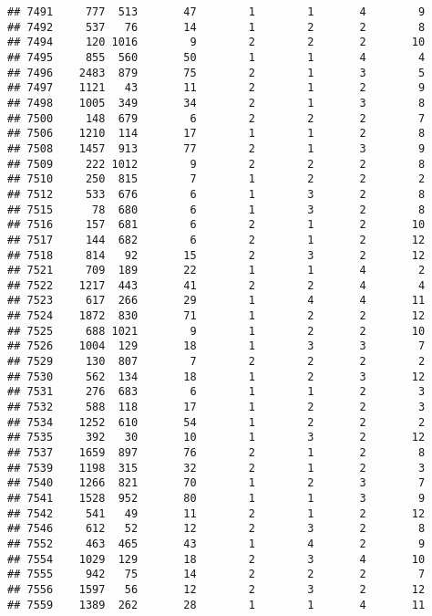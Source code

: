 \documentclass[]{article}
\begin{document}
\begin{verbatim}
## 7491     777  513       47        1        1       4        9
## 7492     537   76       14        1        2       2        8
## 7494     120 1016        9        2        2       2       10
## 7495     855  560       50        1        1       4        4
## 7496    2483  879       75        2        1       3        5
## 7497    1121   43       11        2        1       2        9
## 7498    1005  349       34        2        1       3        8
## 7500     148  679        6        2        2       2        7
## 7506    1210  114       17        1        1       2        8
## 7508    1457  913       77        2        1       3        9
## 7509     222 1012        9        2        2       2        8
## 7510     250  815        7        1        2       2        2
## 7512     533  676        6        1        3       2        8
## 7515      78  680        6        1        3       2        8
## 7516     157  681        6        2        1       2       10
## 7517     144  682        6        2        1       2       12
## 7518     814   92       15        2        3       2       12
## 7521     709  189       22        1        1       4        2
## 7522    1217  443       41        2        2       4        4
## 7523     617  266       29        1        4       4       11
## 7524    1872  830       71        1        2       2       12
## 7525     688 1021        9        1        2       2       10
## 7526    1004  129       18        1        3       3        7
## 7529     130  807        7        2        2       2        2
## 7530     562  134       18        1        2       3       12
## 7531     276  683        6        1        1       2        3
## 7532     588  118       17        1        2       2        3
## 7534    1252  610       54        1        2       2        2
## 7535     392   30       10        1        3       2       12
## 7537    1659  897       76        2        1       2        8
## 7539    1198  315       32        2        1       2        3
## 7540    1266  821       70        1        2       3        7
## 7541    1528  952       80        1        1       3        9
## 7542     541   49       11        2        1       2       12
## 7546     612   52       12        2        3       2        8
## 7552     463  465       43        1        4       2        9
## 7554    1029  129       18        2        3       4       10
## 7555     942   75       14        2        2       2        7
## 7556    1597   56       12        2        3       2       12
## 7559    1389  262       28        1        1       4       11

\end{verbatim}
\end{document}
